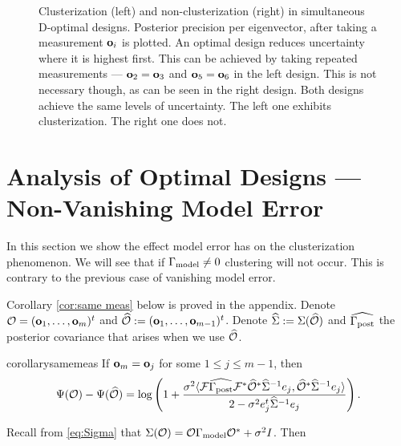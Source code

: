 \documentclass{amsart}
\numberwithin{equation}{section}
\begin{document}
\begin{figure}
  \caption{Clusterization (left) and non-clusterization (right) in
    simultaneous D-optimal designs. Posterior precision per
    eigenvector, after taking a measurement $\mathbf{o}_i$ is plotted. An
    optimal design reduces uncertainty where it is highest first. This
    can be achieved by taking repeated measurements --- $\mathbf{o}_2 =
    \mathbf{o}_3$ and $\mathbf{o}_5 = \mathbf{o}_6$ in the left design. This is not
    necessary though, as can be seen in the right design. Both designs
    achieve the same levels of uncertainty. The left one exhibits
    clusterization. The right one does not.}
  \label{fig:clusterization}
\end{figure}







\section{Analysis of Optimal Designs --- Non-Vanishing Model Error}\label{section:non vanishing}
In this section we show the effect model error has on the
clusterization phenomenon. We will see that if $\Gamma_{\textup{model}} \neq 0$
clustering will not occur. This is contrary to the previous case of
vanishing model error.

Corollary \ref{cor:same meas} below is proved in the appendix. Denote
$\mathcal{O} = (\mathbf{o}_1,\dots,\mathbf{o}_m)^t$ and $\widehat{\mathcal{O}} :=
(\mathbf{o}_1,\dots,\mathbf{o}_{m-1})^t$. Denote $\widehat{\Sigma} := \Sigma (\widehat{\mathcal{O}})$ and
$\widehat{\Gamma_{\textup{post}}}$ the posterior covariance that arises when we use $\widehat{\mathcal{O}}$.
\begin{restatable*}{corollary}{samemeas}\label{cor:same meas}
  If $\mathbf{o}_m = \mathbf{o}_j$ for some $1 \leq j \leq m-1$, then
  \begin{equation*}
    \Psi(\mathcal{O}) - \Psi(\widehat{\mathcal{O}}) =
    \log \left ( 1 + \frac{\sigma^2
      \langle \mathcal{F} \widehat{\Gamma_{\textup{post}}} \mathcal{F}^* \widehat{\mathcal{O}}^* \widehat{\Sigma}^{-1} e_j,
      \widehat{\mathcal{O}}^* \widehat{\Sigma}^{-1}e_j \rangle
    }{
      2 - \sigma^2 e_j^t\widehat{\Sigma}^{-1}e_j 
    }       
    \right ).
  \end{equation*}
\end{restatable*}
Recall from \eqref{eq:Sigma} that $\Sigma(\mathcal{O}) = \mathcal{O} \Gamma_{\textup{model}} \mathcal{O}^*
+ \sigma^2I$. Then
\end{document}
